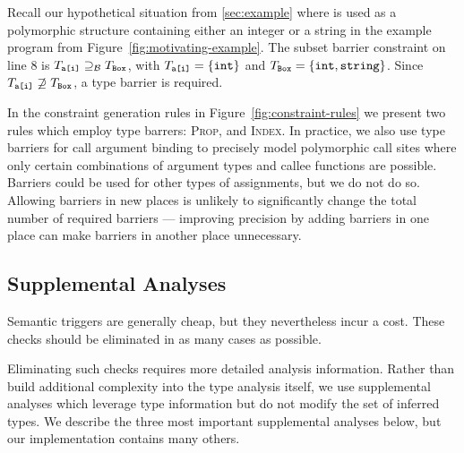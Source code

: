 Recall our hypothetical situation from \Section\ref{sec:example} where  is
used as a polymorphic structure containing either an integer or a string in
the example program from Figure~\ref{fig:motivating-example}. The subset
barrier constraint on line 8 is $T_{\texttt{a[i]}} \supseteq_\mathcal{B} T_{\texttt{Box}}$,
with $T_{\texttt{a[i]}} = \{\texttt{int}\}$ and $T_{\texttt{Box}} = \{\texttt{int},
\texttt{string}\}$. Since $T_{\texttt{a[i]}} \not\supseteq T_{\texttt{Box}}$, a type
barrier is required.

In the constraint generation rules in Figure~\ref{fig:constraint-rules} we
present two rules which employ type barrers:
\textsc{Prop}, and \textsc{Index}. In practice, we also use type barriers for
call argument binding to precisely model polymorphic call sites where
only certain combinations of argument types and callee functions are possible.
Barriers could be used for other types of assignments, but we do not do so.
Allowing barriers in new places is unlikely to significantly change the total
number of required barriers --- improving precision by adding barriers in one
place can make barriers in another place unnecessary.

\subsection{Supplemental Analyses}
\label{sec:supplemental-analyses}

Semantic triggers are generally cheap, but they nevertheless incur a cost.
These checks should be eliminated in as many cases as possible.

Eliminating such checks requires more detailed analysis information.
Rather than build additional complexity into the type analysis itself,
we use supplemental analyses which leverage type information but do not
modify the set of inferred types.
We describe the three most important supplemental analyses below, but
our implementation contains many others.


